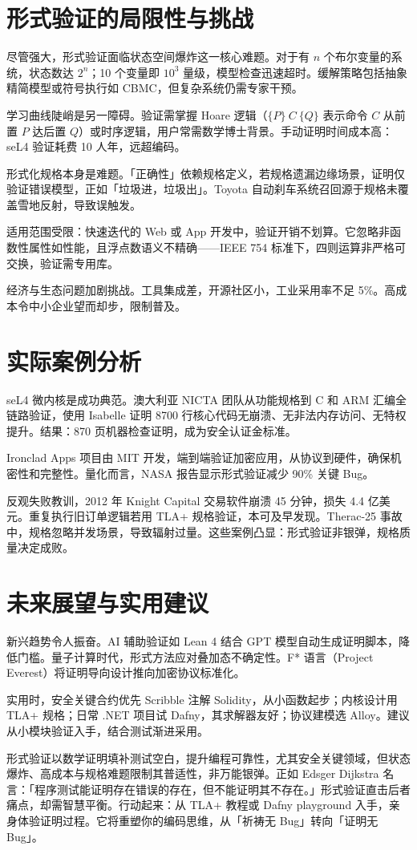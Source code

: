 \chapter{形式验证的局限性与挑战}
尽管强大，形式验证面临状态空间爆炸这一核心难题。对于有 $n$ 个布尔变量的系统，状态数达 $2^n$；10 个变量即 $10^{3}$ 量级，模型检查迅速超时。缓解策略包括抽象精简模型或符号执行如 CBMC，但复杂系统仍需专家干预。\par
学习曲线陡峭是另一障碍。验证需掌握 Hoare 逻辑（$\{P\}~C~\{Q\}$ 表示命令 $C$ 从前置 $P$ 达后置 $Q$）或时序逻辑，用户常需数学博士背景。手动证明时间成本高：seL4 验证耗费 10 人年，远超编码。\par
形式化规格本身是难题。「正确性」依赖规格定义，若规格遗漏边缘场景，证明仅验证错误模型，正如「垃圾进，垃圾出」。Toyota 自动刹车系统召回源于规格未覆盖雪地反射，导致误触发。\par
适用范围受限：快速迭代的 Web 或 App 开发中，验证开销不划算。它忽略非函数性属性如性能，且浮点数语义不精确——IEEE 754 标准下，四则运算非严格可交换，验证需专用库。\par
经济与生态问题加剧挑战。工具集成差，开源社区小，工业采用率不足 5\%{}。高成本令中小企业望而却步，限制普及。\par
\chapter{实际案例分析}
seL4 微内核是成功典范。澳大利亚 NICTA 团队从功能规格到 C 和 ARM 汇编全链路验证，使用 Isabelle 证明 8700 行核心代码无崩溃、无非法内存访问、无特权提升。结果：870 页机器检查证明，成为安全认证金标准。\par
Ironclad Apps 项目由 MIT 开发，端到端验证加密应用，从协议到硬件，确保机密性和完整性。量化而言，NASA 报告显示形式验证减少 90\%{} 关键 Bug。\par
反观失败教训，2012 年 Knight Capital 交易软件崩溃 45 分钟，损失 4.4 亿美元。重复执行旧订单逻辑若用 TLA+ 规格验证，本可及早发现。Therac-25 事故中，规格忽略并发场景，导致辐射过量。这些案例凸显：形式验证非银弹，规格质量决定成败。\par
\chapter{未来展望与实用建议}
新兴趋势令人振奋。AI 辅助验证如 Lean 4 结合 GPT 模型自动生成证明脚本，降低门槛。量子计算时代，形式方法应对叠加态不确定性。F* 语言（Project Everest）将证明导向设计推向加密协议标准化。\par
实用时，安全关键合约优先 Scribble 注解 Solidity，从小函数起步；内核设计用 TLA+ 规格；日常 .NET 项目试 Dafny，其求解器友好；协议建模选 Alloy。建议从小模块验证入手，结合测试渐进采用。\par
形式验证以数学证明填补测试空白，提升编程可靠性，尤其安全关键领域，但状态爆炸、高成本与规格难题限制其普适性，非万能银弹。正如 Edsger Dijkstra 名言：「程序测试能证明存在错误的存在，但不能证明其不存在。」形式验证直击后者痛点，却需智慧平衡。行动起来：从 TLA+ 教程或 Dafny playground 入手，亲身体验证明过程。它将重塑你的编码思维，从「祈祷无 Bug」转向「证明无 Bug」。\par

